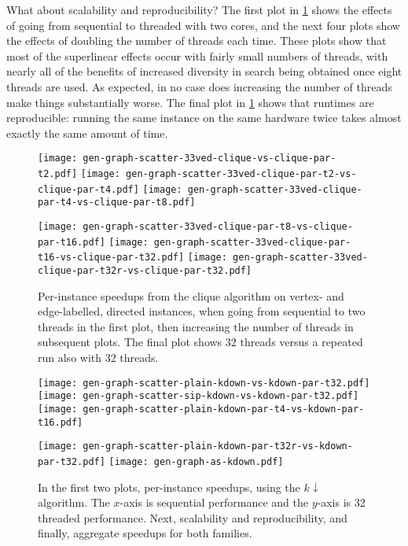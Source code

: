 \documentclass{llncs}
\begin{document}
What about scalability and reproducibility? The first plot in \cref{figure:cliquescale} shows the
effects of going from sequential to threaded with two cores, and the next four plots show the
effects of doubling the number of threads each time. These plots show that most of the superlinear
effects occur with fairly small numbers of threads, with nearly all of the benefits of increased
diversity in search being obtained once eight threads are used. As expected, in no case does
increasing the number of threads make things substantially worse.
The final plot in \cref{figure:cliquescale} shows that runtimes are reproducible: running the same
instance on the same hardware twice takes almost exactly the same amount of time.

\begin{figure}[p]
    \texttt{[image: gen-graph-scatter-33ved-clique-vs-clique-par-t2.pdf]}
    \hfill
    \texttt{[image: gen-graph-scatter-33ved-clique-par-t2-vs-clique-par-t4.pdf]}
    \hfill
    \texttt{[image: gen-graph-scatter-33ved-clique-par-t4-vs-clique-par-t8.pdf]}

    \vspace*{0.2em}

    \texttt{[image: gen-graph-scatter-33ved-clique-par-t8-vs-clique-par-t16.pdf]}
    \hfill
    \texttt{[image: gen-graph-scatter-33ved-clique-par-t16-vs-clique-par-t32.pdf]}
    \hfill
    \texttt{[image: gen-graph-scatter-33ved-clique-par-t32r-vs-clique-par-t32.pdf]}

    \caption{Per-instance speedups from the clique algorithm on vertex- and edge-labelled, directed
    instances, when going from sequential to two threads in the first plot, then increasing the
    number of threads in subsequent plots. The final plot shows 32 threads versus a repeated run
    also with 32 threads.}\label{figure:cliquescale}
\end{figure}

\begin{figure}[p]
    \texttt{[image: gen-graph-scatter-plain-kdown-vs-kdown-par-t32.pdf]}
    \hfill
    \texttt{[image: gen-graph-scatter-sip-kdown-vs-kdown-par-t32.pdf]}
    \hfill
    \texttt{[image: gen-graph-scatter-plain-kdown-par-t4-vs-kdown-par-t16.pdf]}

    \vspace*{0.2em}

    \texttt{[image: gen-graph-scatter-plain-kdown-par-t32r-vs-kdown-par-t32.pdf]}
    \hfill
    \texttt{[image: gen-graph-as-kdown.pdf]}

    \caption{In the first two plots, per-instance speedups, using the $k{\downarrow}$ algorithm. The
    $x$-axis is sequential performance and the $y$-axis is 32 threaded performance. Next,
    scalability and reproducibility, and finally, aggregate speedups for both
    families.}\label{figure:kdownscatters}
\end{figure}
\end{document}
